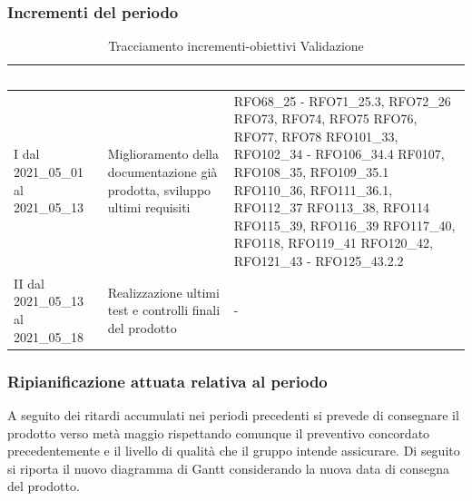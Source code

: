 \subsubsection{Incrementi del periodo}
\label{IncrementiValidazione}
\begin{table}[H]
	\begin{center}
		\begin{tabular}{ |C{3cm} C{6cm} C{7cm}| }
			\textcolor{white}{\textbf{Incremento}} & \textcolor{white}{\textbf{Obiettivi}} & \textcolor{white}{\textbf{Requisiti}} \\ \hline
			I dal 2021\_05\_01 al 2021\_05\_13& Miglioramento della documentazione già prodotta, sviluppo ultimi requisiti & RFO68\_25 - RFO71\_25.3, RFO72\_26 \newline
			RFO73,
			RFO74,
			RFO75 \newline
			RFO76, RFO77, RFO78 \newline
			RFO101\_33, RFO102\_34 - RFO106\_34.4 \newline
			RF0107,  RFO108\_35, RFO109\_35.1 \newline 
			RFO110\_36, RFO111\_36.1, RFO112\_37 \newline
			RFO113\_38, RFO114 \newline RFO115\_39, RFO116\_39 \newline
			RFO117\_40,
			RFO118, RFO119\_41 \newline
			RFO120\_42, RFO121\_43 - RFO125\_43.2.2
			\\ \hline
			II dal 2021\_05\_13 al 2021\_05\_18 	& 
			Realizzazione ultimi test e controlli finali del prodotto & -\\ \hline
		\end{tabular}
		\caption{Tracciamento incrementi-obiettivi Validazione}
	\end{center}
\end{table}
\subsubsection{Ripianificazione attuata relativa al periodo} \label{RipianificazioneValidazione}
A seguito dei ritardi accumulati nei periodi precedenti si prevede di consegnare il prodotto verso metà maggio rispettando comunque il preventivo concordato precedentemente e il livello di qualità che il gruppo intende assicurare. Di seguito si riporta il nuovo diagramma di Gantt considerando la nuova data di consegna del prodotto.
